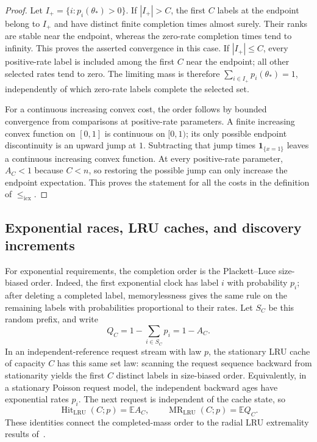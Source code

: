 \documentclass[11pt]{article}
\theoremstyle{definition}
\theoremstyle{remark}
\newcommand{\E}{\mathbb E}
\newcommand{\1}{\mathbf 1}
\begin{document}
\begin{proof}
Let \(I_+=\{i:p_i(\theta_*)>0\}\).  If \(|I_+|>C\), the first
\(C\) labels at the endpoint belong to \(I_+\) and have distinct
finite completion times almost surely.  Their ranks are stable
near the endpoint, whereas the zero-rate completion times tend to
infinity.  This proves the asserted convergence in this case.
If \(|I_+|\le C\), every positive-rate label is included among the
first \(C\) near the endpoint; all other selected rates tend to
zero.  The limiting mass is therefore
\(\sum_{i\in I_+}p_i(\theta_*)=1\), independently of which
zero-rate labels complete the selected set.

For a continuous increasing convex cost, the order follows by
bounded convergence from comparisons at positive-rate parameters.
A finite increasing convex function on \([0,1]\) is continuous
on \([0,1)\); its only possible endpoint discontinuity is an upward
jump at \(1\).  Subtracting that jump times \(\1_{\{x=1\}}\)
leaves a continuous increasing convex function.  At every
positive-rate parameter, \(A_C<1\) because \(C<n\), so restoring
the possible jump can only increase the endpoint expectation.
This proves the statement for all the costs in the definition of
\(\le_{\mathrm{icx}}\).
\end{proof}

\subsection{Exponential races, LRU caches, and discovery increments}

For exponential requirements, the completion order is the
Plackett--Luce size-biased order.  Indeed, the first exponential
clock has label \(i\) with probability \(p_i\); after deleting a
completed label, memorylessness gives the same rule on the
remaining labels with probabilities proportional to their rates.
Let \(S_C\) be this random prefix, and write
\begin{equation}\label{eq:race-residual-mass}
  Q_C=1-\sum_{i\in S_C}p_i=1-A_C.
\end{equation}
In an independent-reference request stream with law \(p\), the
stationary LRU cache of capacity \(C\) has this same set law:
scanning the request sequence backward from stationarity yields
the first \(C\) distinct labels in size-biased order.  Equivalently,
in a stationary Poisson request model, the independent backward
ages have exponential rates \(p_i\).  The next request is
independent of the cache state, so
\begin{equation}\label{eq:lru-residual-mass-identity}
  \operatorname{Hit}_{\mathrm{LRU}}(C;p)=\E A_C,
  \qquad
  \operatorname{MR}_{\mathrm{LRU}}(C;p)=\E Q_C.
\end{equation}
These identities connect the completed-mass order to the radial
LRU extremality results of~\cite{LongLRU2026,LongRank2026}.
\end{document}
